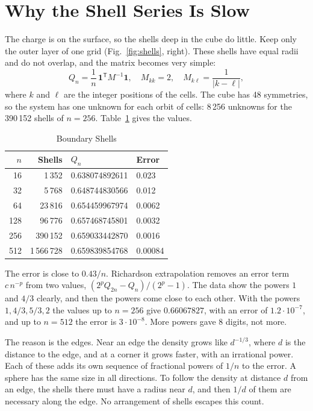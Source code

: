 \documentclass[journal]{IEEEtran}
\newcommand{\one}{\mathbf 1}
\newcommand{\T}{\mathsf T}
\begin{document}
\section{Why the Shell Series Is Slow}
The charge is on the surface, so the shells deep in the cube do little. Keep only the outer layer of one grid (Fig.~\ref{fig:shells}, right). These shells have equal radii and do not overlap, and the matrix becomes very simple:
\begin{equation}
Q_n = \frac1n\, \one^{\T} M^{-1} \one, \quad M_{kk} = 2, \quad M_{k\ell} = \frac{1}{|k-\ell|},
\end{equation}
where $k$ and $\ell$ are the integer positions of the cells. The cube has 48 symmetries, so the system has one unknown for each orbit of cells: 8\,256 unknowns for the 390\,152 shells of $n = 256$. Table~\ref{tab:boundary} gives the values.

\begin{table}[!t]
\caption{Boundary Shells}
\label{tab:boundary}
\centering
\begin{tabular}{rrll}
\toprule
$n$ & Shells & $Q_n$ & Error\\
\midrule
16 & 1\,352 & 0.638074892611 & 0.023\\
32 & 5\,768 & 0.648744830566 & 0.012\\
64 & 23\,816 & 0.654459967974 & 0.0062\\
128 & 96\,776 & 0.657468745801 & 0.0032\\
256 & 390\,152 & 0.659033442870 & 0.0016\\
512 & 1\,566\,728 & 0.659839854768 & 0.00084\\
\bottomrule
\end{tabular}
\end{table}

The error is close to $0.43/n$. Richardson extrapolation removes an error term $c\,n^{-p}$ from two values, $(2^p Q_{2n} - Q_n)/(2^p-1)$. The data show the powers $1$ and $4/3$ clearly, and then the powers come close to each other. With the powers $1, 4/3, 5/3, 2$ the values up to $n = 256$ give $0.66067827$, with an error of $1.2\cdot10^{-7}$, and up to $n = 512$ the error is $3\cdot10^{-8}$. More powers gave 8 digits, not more.

The reason is the edges. Near an edge the density grows like $d^{-1/3}$, where $d$ is the distance to the edge, and at a corner it grows faster, with an irrational power. Each of these adds its own sequence of fractional powers of $1/n$ to the error. A sphere has the same size in all directions. To follow the density at distance $d$ from an edge, the shells there must have a radius near $d$, and then $1/d$ of them are necessary along the edge. No arrangement of shells escapes this count.
\end{document}
